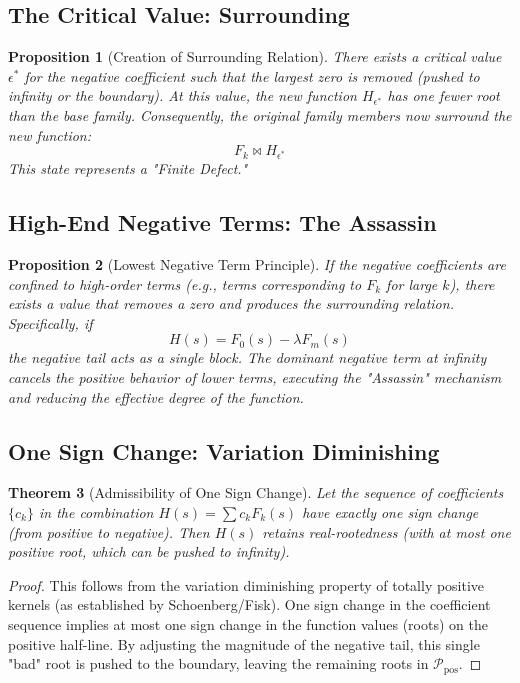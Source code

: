 \documentclass[11pt]{article}
\theoremstyle{breakdef}
\newtheorem{theorem}{Theorem}[section]
\newtheorem{proposition}[theorem]{Proposition}
\begin{document}
\subsection{The Critical Value: Surrounding}
\begin{proposition}[Creation of Surrounding Relation]
There exists a critical value $\epsilon^*$ for the negative coefficient such that the largest zero is removed (pushed to infinity or the boundary). 
At this value, the new function $H_{\epsilon^*}$ has one fewer root than the base family. Consequently, the original family members now \emph{surround} the new function:
\begin{equation}
F_k \bowtie H_{\epsilon^*}
\end{equation}
This state represents a "Finite Defect."
\end{proposition}

\subsection{High-End Negative Terms: The Assassin}
\begin{proposition}[Lowest Negative Term Principle]
If the negative coefficients are confined to high-order terms (e.g., terms corresponding to $F_k$ for large $k$), there exists a value that removes a zero and produces the surrounding relation.
Specifically, if 
\begin{equation}
H(s) = F_0(s) - \lambda F_m(s)
\end{equation}
the negative tail acts as a single block. The dominant negative term at infinity cancels the positive behavior of lower terms, executing the "Assassin" mechanism and reducing the effective degree of the function.
\end{proposition}

\subsection{One Sign Change: Variation Diminishing}
\begin{theorem}[Admissibility of One Sign Change]
Let the sequence of coefficients $\{c_k\}$ in the combination $H(s) = \sum c_k F_k(s)$ have exactly one sign change (from positive to negative).
Then $H(s)$ retains real-rootedness (with at most one positive root, which can be pushed to infinity).
\end{theorem}
\begin{proof}
This follows from the variation diminishing property of totally positive kernels (as established by Schoenberg/Fisk). One sign change in the coefficient sequence implies at most one sign change in the function values (roots) on the positive half-line. By adjusting the magnitude of the negative tail, this single "bad" root is pushed to the boundary, leaving the remaining roots in $\mathcal{P}_{\mathrm{pos}}$.
\end{proof}
\end{document}
